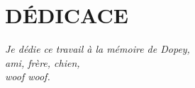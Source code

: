 \chapter*{DÉDICACE}\thispagestyle{headings}
\begin{flushright}
  \itshape
  Je dédie ce travail à la mémoire de Dopey,\\
  ami, frère, chien,\\
  woof woof.
\end{flushright}
